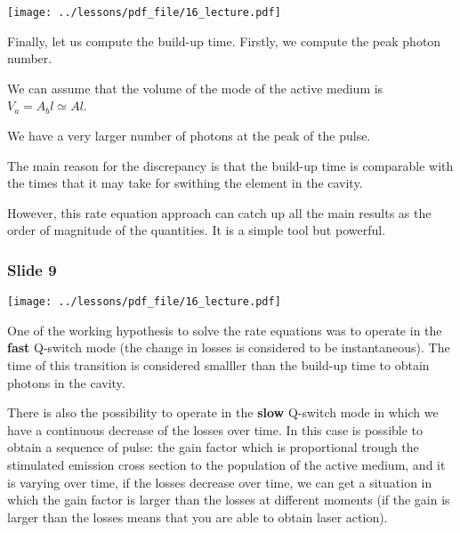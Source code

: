 \documentclass[../main/main.tex]{subfiles}
\begin{document}
\begin{minipage}[]{0.5\linewidth}
\centering
\texttt{[image: ../lessons/pdf\_file/16\_lecture.pdf]}
\end{minipage}
\hspace{0.3cm}\vspace{0.3cm}
\begin{minipage}[c]{0.47\linewidth}

Finally, let us compute the build-up time. Firstly, we compute the peak photon number.

We can assume that the volume of the mode of the active medium is \( V_a = A_b l \simeq A l \).

We have a very larger number of photons at the peak of the pulse.

The main reason for the discrepancy is that the build-up time is comparable with the times that it may take for swithing the element in the cavity.

However, this rate equation approach can catch up all the main results as the order of magnitude of the quantities.
It is a simple tool but powerful.

\end{minipage}

\subsubsection*{Slide 9}

\begin{minipage}[]{0.5\linewidth}
\centering
\texttt{[image: ../lessons/pdf\_file/16\_lecture.pdf]}
\end{minipage}
\hspace{0.3cm}\vspace{0.3cm}
\begin{minipage}[c]{0.47\linewidth}

One of the working hypothesis to solve the rate equations was to operate in the \textbf{fast} Q-switch mode (the change in losses is considered to be instantaneous). The time of this transition is considered smalller than the build-up time to obtain photons in the cavity.

There is also the possibility to operate in the \textbf{slow} Q-switch mode in which we have a continuous decrease of the losses over time. In this case is possible to obtain a sequence of pulse: the gain factor which is proportional trough the stimulated emission cross section to the population of the active medium, and it is varying over time, if the losses decrease over time, we can get a situation in which the gain factor is larger than the losses at different moments (if the gain is larger than the losses means that you are able to obtain laser action).

\end{minipage}
\end{document}
